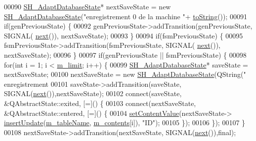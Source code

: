\begin{DoxyCode}
00090                 \hyperlink{classSH__AdaptDatabaseState}{SH\_AdaptDatabaseState}* nextSaveState = \textcolor{keyword}{new} 
      \hyperlink{classSH__AdaptDatabaseState}{SH\_AdaptDatabaseState}(\textcolor{stringliteral}{"enregistrement 0 de la machine "}+
      \hyperlink{classSH__GenericStateMachine_a85c0c1c9d258ae991f84667412fa47cd}{toString}());
00091                 \textcolor{keywordflow}{if}(genPreviousState) \{
00092                     genPreviousState->addTransition(genPreviousState, SIGNAL(
      \hyperlink{classSH__GenericStateMachine_af4771d31d87951c997fba1633c2d67f6}{next}()), nextSaveState);
00093                 \}
00094                 \textcolor{keywordflow}{if}(fsmPreviousState) \{
00095                     fsmPreviousState->addTransition(fsmPreviousState, SIGNAL(
      \hyperlink{classSH__GenericStateMachine_af4771d31d87951c997fba1633c2d67f6}{next}()), nextSaveState);
00096                 \}
00097                 \textcolor{keywordflow}{if}(genPreviousState || fsmPreviousState) \{
00098                     \textcolor{keywordflow}{for}(\textcolor{keywordtype}{int} i = 1; i < \hyperlink{classSH__LoopingInOutStateMachine_a818a60d3691fcac11323ad114c309dcb}{m\_limit}; i++) \{
00099                         \hyperlink{classSH__AdaptDatabaseState}{SH\_AdaptDatabaseState}* saveState = nextSaveState;
00100                         nextSaveState = \textcolor{keyword}{new} \hyperlink{classSH__AdaptDatabaseState}{SH\_AdaptDatabaseState}(QString(\textcolor{stringliteral}{"
      enregistrement %
00101                         saveState->addTransition(saveState, SIGNAL(\hyperlink{classSH__GenericStateMachine_af4771d31d87951c997fba1633c2d67f6}{next}()),nextSaveState);
00102                         connect(saveState, &QAbstractState::exited, [=]() \{
00103                             connect(nextSaveState, &QAbstractState::entered, [=]() \{
00104                                 \hyperlink{classSH__InOutStateMachine_a9ab1534306b2bdb62743d4bcefe40c17}{setContentValue}(nextSaveState->
      \hyperlink{classSH__AdaptDatabaseState_a037db544ea05f42d21fcbdda758839fe}{insertUpdate}(\hyperlink{classSH__InOutStateMachine_aa009eecc5ab6181358faafb5996b6006}{m\_tableName}, \hyperlink{classSH__LoopingInOutStateMachine_a145e625dcb4d5438bd9c761eeb9425d4}{m\_contents}[i]), \textcolor{stringliteral}{"ID"});
00105                             \});
00106                         \});
00107                     \}
00108                     nextSaveState->addTransition(nextSaveState, SIGNAL(\hyperlink{classSH__GenericStateMachine_af4771d31d87951c997fba1633c2d67f6}{next}()),\textcolor{keyword}{final});
}
\end{DoxyCode}
